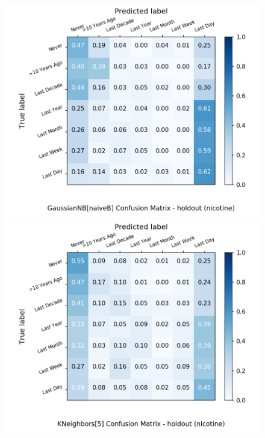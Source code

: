 \begin{figure}[H]
\begin{minipage}[b]{0.32\textwidth}
		\includegraphics[width=1.1\textwidth]{Plots/nicotine_GaussianNB_naiveB_balance_False_holdout.png}
	\end{minipage}
	\begin{minipage}[b]{0.32\textwidth}
		\includegraphics[width=1.1\textwidth]{Plots/nicotine_KNeighbors_5_balance_False_holdout.png}
  \end{minipage}
	\begin{minipage}[b]{0.32\textwidth}

\end{minipage}
\end{figure}
